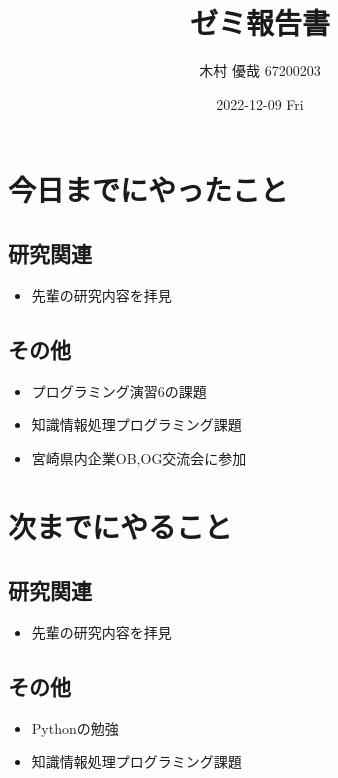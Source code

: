 \documentclass[uplatex, onecolumn, 10pt]{jsarticle}
\begin{document}
\title{\vspace{-40mm}\bf{\LARGE{ゼミ報告書}}}
\author{\vspace{-40mm}木村 優哉 67200203}
\date{2022-12-09 Fri}
\maketitle


\section{今日までにやったこと}

\subsection*{研究関連} 
\begin{itemize}
	\item 先輩の研究内容を拝見
\end{itemize}

\subsection*{その他}
\begin{itemize}
	\item プログラミング演習6の課題
	\item 知識情報処理プログラミング課題
	\item 宮崎県内企業OB,OG交流会に参加
\end{itemize}


\section{次までにやること}

\subsection*{研究関連} 
\begin{itemize}
	\item 先輩の研究内容を拝見
\end{itemize}

\subsection*{その他}
\begin{itemize}
	\item Pythonの勉強
	\item 知識情報処理プログラミング課題
\end{itemize}
\end{document}
